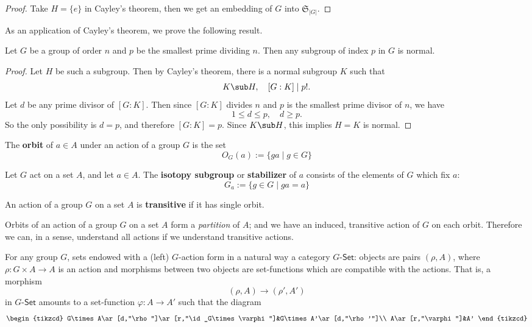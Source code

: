 \begin{proof}
Take $H=\{e\}$ in Cayley's theorem, then we get an embedding of $G$ into $\mathfrak{S}_{|G|}$.
\end{proof}
As an application of Cayley's theorem, we prove the following result.
\begin{proposition}
Let $G$ be a group of order $n$ and $p$ be the smallest prime dividing $n$. Then any subgroup of index $p$ in $G$ is normal.
\end{proposition}
\begin{proof}
Let $H$ be such a subgroup. Then by Cayley's theorem, there is a normal subgroup $K$ such that 
\[K\sub H,\quad [G:K]\mid p!.\] 
Let $d$ be any prime divisor of $[G:K]$. Then since $[G:K]$ divides $n$ and $p$ is the smallest prime divisor of $n$, we have
\[1\leq d\leq p,\quad d\geq p.\]
So the only possibility is $d=p$, and therefore $[G:K]=p$. Since $K\sub H$, this implies $H=K$ is normal.
\end{proof}
\begin{definition}
The \textbf{orbit} of $a\in A$ under an action of a group $G$ is the set
\[O_G(a):=\{ga\mid g\in G\}\]
\end{definition}
\begin{definition}
Let $G$ act on a set $A$, and let $a\in A$. The \textbf{isotopy subgroup} or \textbf{stabilizer} of $a$ consists of the elements of $G$ which fix $a$:
\[G_a:=\{g\in G\mid ga=a\}\]
\end{definition}
\begin{definition}
An action of a group $G$ on a set $A$ is \textbf{transitive} if it has single orbit.
\end{definition}
Orbits of an action of a group $G$ on a set $A$ form a \textit{partition} of $A$; and we have an induced, transitive action of $G$ on each orbit. Therefore we can, in a sense, understand all actions if we understand transitive actions.\par
For any group $G$, sets endowed with a (left) $G$-action form in a natural way a category $G$-$\mathsf{Set}$: objects are pairs $(\rho,A)$, where $\rho:G\times A\to A$ is an action and morphisms between two objects are set-functions which are compatible with the actions. That is, a morphism
\[(\rho,A)\to(\rho',A')\]
in $G$-$\mathsf{Set}$ amounts to a set-function $\varphi:A\to A'$ such that the diagram
\[\begin{tikzcd}
G\times A\ar[d,"\rho"]\ar[r,"\id_G\times\varphi"]&G\times A'\ar[d,"\rho'"]\\
A\ar[r,"\varphi"]&A'
\end{tikzcd}\]

